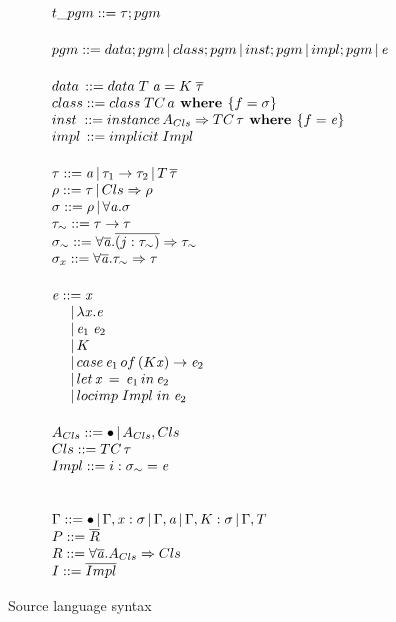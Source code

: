 \documentclass{article}
\begin{document}
\begin{figure}
  \[
\begin{array}{@{\hspace{0mm}}l@{\hspace{0mm}}}  
  t\_pgm ::= \type;pgm\\[5mm]
  pgm ::= data;pgm\,|\,class;pgm\,|\,inst;pgm\,|\,impl;pgm\,|\,\term
  \\[5mm]
 data\,::= data\;T\;\tyVar=K\;\overline{\type}\\
 class ::=class\; TC\,a\textbf{ where }\{f=\typeS\}\\
 inst\;::=instance\,A_{Cls}\Rightarrow TC \,\type\textbf{ where }\{f=\term\}\\
 impl\,::=implicit\; Impl
  \\[5mm]
  \type ::= \tyVar\,|\,\type_1\to\type_2\,|\,T\,\overline{\type}\\
  \qtype ::= \type\,|\,Cls \Rightarrow \qtype\\
  \typeS ::= \qtype\,|\,\forall\tyVar.\typeS\\
  \type_{\sim} ::= \type \to \type\\
  \typeS_{\sim} ::= \forall \overline {\tyVar} . \overline{(j : \type_{\sim})} \Rightarrow \type_{\sim}\\
  \typeS_x ::= \forall \overline{\tyVar}.\type_{\sim}\Rightarrow \type
 \\[5mm]

  \term ::= \tmVar\\
  \phantom{\term ::}|\,\lambda \tmVar.\term\\
  \phantom{\term ::}|\,\term_1 \; \term_2\\
  \phantom{\term ::}|\, K\\
  \phantom{\term ::}|\, case \, \term_1 \, of\, (K \tmVar) \rightarrow \term_2\\
  \phantom{\term ::}|\, let \, \tmVar \, =\, \term_1 \,in\, \term_2  \\
  \phantom{\term ::}|\, locimp \; Impl\; in\; \term_2

  \\[5mm]
  A_{Cls} ::= \bullet\,|\,A_{Cls},Cls\\
  Cls ::= TC\,\type\\
  Impl ::= i : \typeS_{\sim}=\term\\
  \\[5mm]
  \tyEnv::=\bullet\,|\,\tyEnv,\tmVar:\typeS\,|\,\tyEnv,\tyVar\,|\,\tyEnv,K:\typeS\,|\,\tyEnv,T\\
  \thEnv::=\overline{R}\\
  R ::= \forall\overline{\tyVar}.A_{Cls}\Rightarrow Cls\\
  \imEnv::=\overline{Impl}
  \end{array}
\]
  \caption{Source language syntax}
\end{figure}
\end{document}
